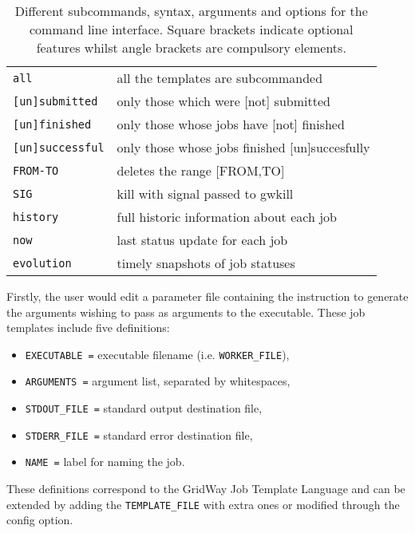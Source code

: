 \documentclass[12pt,a4paper]{article}
\begin{document}
\begin{itemize}
{\begin{table}[!th]
\begin{tabular}{ll}
{\tt all} &               all the templates are subcommanded\\
{\tt [un]submitted} &     only those which were [not] submitted\\
{\tt [un]finished} &      only those whose jobs have [not] finished\\
{\tt [un]successful} &    only those whose jobs finished [un]succesfully\\
{\tt FROM-TO} &           deletes the range [FROM,TO]\\
{\tt SIG} &               kill with signal passed to gwkill\\
{\tt history} &           full historic information about each job\\
{\tt now} &               last status update for each job\\
{\tt evolution} &         timely snapshots of job statuses\\
\hline
\end{tabular}
\caption{Different subcommands, syntax, arguments and options for the command line interface. Square brackets indicate optional features whilst angle brackets are compulsory elements.}
\label{usagetable}
\end{table}

Firstly, the user would edit a parameter file containing the instruction to generate the arguments wishing to pass as arguments to the executable. These job templates include five definitions:
\begin{itemize}
\item {\tt EXECUTABLE =} executable filename (i.e. {\tt WORKER\_FILE}),
\item {\tt ARGUMENTS =} argument list, separated by whitespaces,
\item {\tt STDOUT\_FILE =} standard output destination file,
\item {\tt STDERR\_FILE =} standard error destination file,
\item {\tt NAME =} label for naming the job.
\end{itemize}

These definitions correspond to the GridWay Job Template Language and can be extended by adding the {\tt TEMPLATE\_FILE} with extra ones or modified through the config option.

}
\end{itemize}
\end{document}
